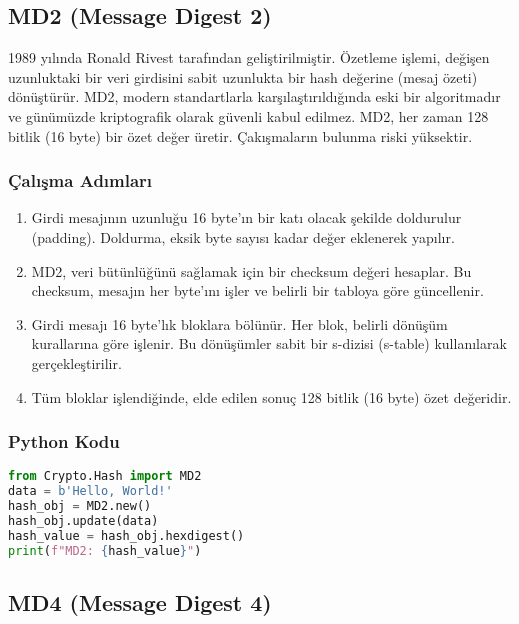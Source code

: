 \newpage

\subsection{MD2 (Message Digest 2)}

1989 yılında Ronald Rivest tarafından geliştirilmiştir. Özetleme işlemi, değişen uzunluktaki bir veri girdisini sabit uzunlukta bir hash değerine (mesaj özeti) dönüştürür. MD2, modern standartlarla karşılaştırıldığında eski bir algoritmadır ve günümüzde kriptografik olarak güvenli kabul edilmez. MD2, her zaman 128 bitlik (16 byte) bir özet değer üretir. Çakışmaların bulunma riski yüksektir.

\subsubsection{Çalışma Adımları}

\begin{enumerate}
    \item Girdi mesajının uzunluğu 16 byte'ın bir katı olacak şekilde doldurulur (padding). Doldurma, eksik byte sayısı kadar değer eklenerek yapılır.
    \item MD2, veri bütünlüğünü sağlamak için bir checksum değeri hesaplar. Bu checksum, mesajın her byte'ını işler ve belirli bir tabloya göre güncellenir.
    \item Girdi mesajı 16 byte'lık bloklara bölünür. Her blok, belirli dönüşüm kurallarına göre işlenir. Bu dönüşümler sabit bir s-dizisi (s-table) kullanılarak gerçekleştirilir.
    \item Tüm bloklar işlendiğinde, elde edilen sonuç 128 bitlik (16 byte) özet değeridir.
\end{enumerate}

\subsubsection{Python Kodu}

\begin{lstlisting}[language=Python]
from Crypto.Hash import MD2
data = b'Hello, World!'
hash_obj = MD2.new()
hash_obj.update(data)
hash_value = hash_obj.hexdigest()
print(f"MD2: {hash_value}")
\end{lstlisting}

\newpage

\subsection{MD4 (Message Digest 4)}

